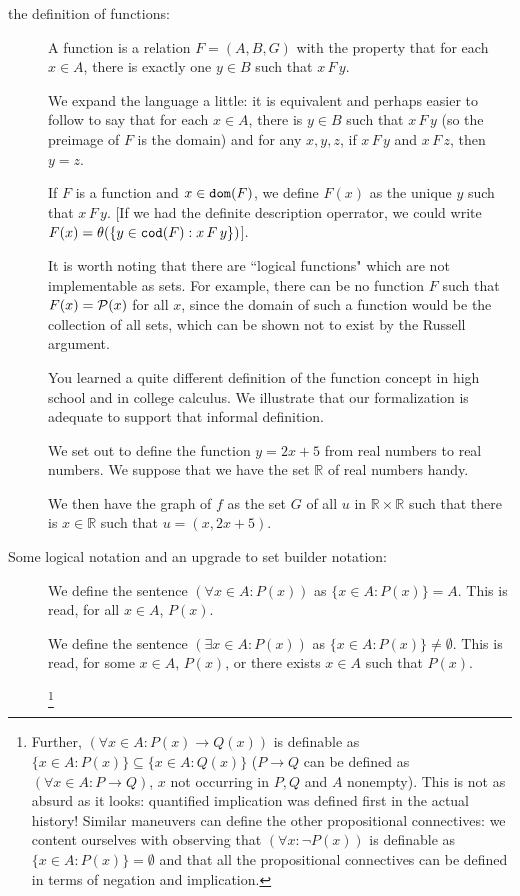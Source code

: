\documentclass[12pt]{article}
\begin{document}
\begin{description}
\item[the definition of functions:]

A function is a relation $F = (A,B,G)$ with the property that for each $x \in A$, there is exactly one $y \in B$ such that $x \, F \, y$.

We expand the language a little:  it is equivalent and perhaps easier to follow to say that for each $x \in A$, there is $y \in B$ such that $x \, F\, y$ (so the preimage of $F$ is the domain) and for any $x,y,z$, if $x \, F \, y$ and $x \, F\, z$, then $y=z$.

If $F$ is a function and $x \in {\tt dom}(F)$, we define $F(x)$ as the unique $y$ such that $x \, F \, y$.  [If we had the definite description operrator, we could write $F(x) = \theta(\{y\in {\tt cod}(F):x \, F \, y\})$].

It is worth noting that there are ``logical functions" which are not implementable as sets.  For example,
there can be no function $F$ such that $F(x) = {\cal P}(x)$ for all $x$, since the domain of such a function would be the collection of all sets, which can be shown not to exist by the Russell argument.

You learned a quite different definition of the function concept in high school and in college calculus.  We illustrate that our formalization is adequate to support that informal definition.

We set out to define the function $y=2x+5$ from real numbers to real numbers.  We suppose that we have the set
$\mathbb R$ of real numbers handy.

We then have the graph of $f$ as the set $G$ of all $u$ in $\mathbb R \times \mathbb R$ such that there is $x \in \mathbb R$ such that $u = (x,2x+5)$.

\item[Some logical notation and an upgrade to set builder notation:]

We define the sentence $(\forall x \in A:P(x))$ as $\{x \in A:P(x)\} = A$.  This is read, for all $x \in A$, $P(x)$.

We define the sentence $(\exists x \in A:P(x))$ as $\{x \in A:P(x)\} \neq \emptyset$.  This is read, for some $x \in A$, $P(x)$, or there exists $x \in A$ such that $P(x)$.

\footnote{Further, $(\forall x \in A:P(x) \rightarrow Q(x))$ is definable as $\{x \in A:P(x)\} \subseteq \{x \in A:Q(x)\}$
($P \rightarrow Q$ can be defined as $(\forall x \in A:P \rightarrow Q)$, $x$ not occurring in $P,Q$ and $A$ nonempty).  This is not as  absurd as it looks:  quantified implication was defined first in the actual history!  Similar maneuvers can define the other propositional connectives:  we content ourselves with observing that $(\forall x:\neg P(x))$ is definable as $\{x \in A:P(x)\} = \emptyset$ and that all the propositional connectives can be defined in terms of negation and implication.}


\end{description}
\end{document}
